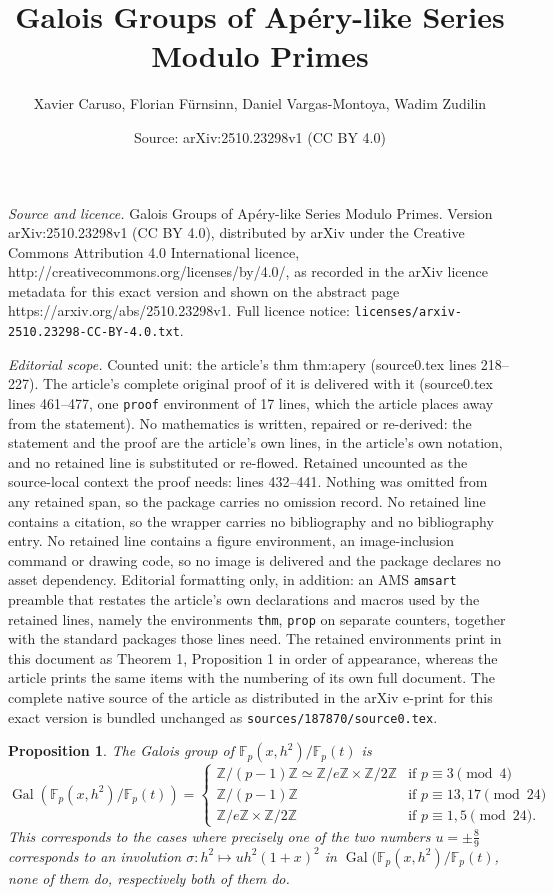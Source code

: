 \documentclass[10pt,a4paper]{amsart}
\title{Galois Groups of Apéry-like Series Modulo Primes}
\author{Xavier Caruso, Florian F\"urnsinn, Daniel Vargas-Montoya, Wadim Zudilin}
\date{Source: arXiv:2510.23298v1 (CC BY 4.0)}
\newtheorem{prop}{Proposition}
\newcommand{\F}{\mathbb{F}}
\DeclareMathOperator{\Gal}{Gal}
\newcommand{\Z}{\mathbb{Z}}
\begin{document}
\maketitle

\noindent\emph{Source and licence.} Galois Groups of Apéry-like Series Modulo Primes. Version arXiv:2510.23298v1 (CC BY 4.0), distributed by arXiv under the Creative Commons Attribution 4.0 International licence, http://creativecommons.org/licenses/by/4.0/, as recorded in the arXiv licence metadata for this exact version and shown on the abstract page https://arxiv.org/abs/2510.23298v1. Full licence notice: \texttt{licenses/arxiv-2510.23298-CC-BY-4.0.txt}.\par\smallskip

\noindent\textit{Editorial scope.} Counted unit: the article's thm thm:apery (source0.tex lines 218--227). The article's complete original proof of it is delivered with it (source0.tex lines 461--477, one \texttt{proof} environment of 17 lines, which the article places away from the statement). No mathematics is written, repaired or re-derived: the statement and the proof are the article's own lines, in the article's own notation, and no retained line is substituted or re-flowed.  Retained uncounted as the source-local context the proof needs: lines 432--441.  Nothing was omitted from any retained span, so the package carries no omission record.  No retained line contains a citation, so the wrapper carries no bibliography and no bibliography entry.  No retained line contains a figure environment, an image-inclusion command or drawing code, so no image is delivered and the package declares no asset dependency.  Editorial formatting only, in addition: an AMS \texttt{amsart} preamble that restates the article's own declarations and macros used by the retained lines, namely the environments \texttt{thm}, \texttt{prop} on separate counters, together with the standard packages those lines need.  The retained environments print in this document as Theorem 1, Proposition 1 in order of appearance, whereas the article prints the same items with the numbering of its own full document.  The complete native source of the article as distributed in the arXiv e-print for this exact version is bundled unchanged as \texttt{sources/187870/source0.tex}.
\begin{prop} \label{prop:Galh}
    The Galois group of $\F_p(x,h^2)/\F_p(t)$ is 
    \[\Gal(\F_p(x,h^2)/\F_p(t)) = \begin{cases}
        \Z/(p{-}1)\Z\simeq \Z/e\Z\times \Z/2\Z & \text{if } p\equiv 3 \pmod 4\\
        \Z/(p{-}1)\Z & \text{if } p\equiv 13, 17 \pmod {24}\\
        \Z/e\Z\times \Z/2\Z& \text{if } p\equiv 1, 5 \pmod {24}.
    \end{cases}
    \]
    This corresponds to the cases where precisely one of the two numbers $u =\pm \frac 8 9$ corresponds to an involution $\sigma: h^2\mapsto u h^2 (1+x)^2$ in $\Gal(\F_p(x, h^2)/\F_p(t)$, none of them do, respectively both of them do.
\end{prop}
\end{document}
